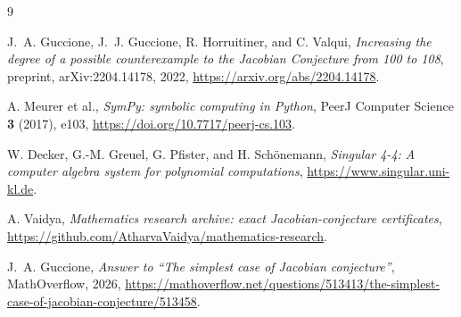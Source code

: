 \documentclass[11pt]{article}
\theoremstyle{definition}
\theoremstyle{remark}
\begin{document}
\begin{thebibliography}{9}

J.~A. Guccione, J.~J. Guccione, R. Horruitiner, and C. Valqui,
\emph{Increasing the degree of a possible counterexample to the Jacobian
Conjecture from 100 to 108},
preprint, arXiv:2204.14178, 2022,
\url{https://arxiv.org/abs/2204.14178}.

A. Meurer et al.,
\emph{SymPy: symbolic computing in Python},
PeerJ Computer Science \textbf{3} (2017), e103,
\url{https://doi.org/10.7717/peerj-cs.103}.

W. Decker, G.-M. Greuel, G. Pfister, and H. Sch\"onemann,
\emph{Singular 4-4: A computer algebra system for polynomial
computations},
\url{https://www.singular.uni-kl.de}.

A. Vaidya,
\emph{Mathematics research archive: exact Jacobian-conjecture
certificates},
\url{https://github.com/AtharvaVaidya/mathematics-research}.

J.~A. Guccione,
\emph{Answer to ``The simplest case of Jacobian conjecture''},
MathOverflow, 2026,
\url{https://mathoverflow.net/questions/513413/the-simplest-case-of-jacobian-conjecture/513458}.

\end{thebibliography}
\end{document}
